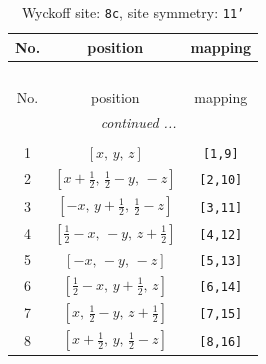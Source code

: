 \documentclass[fleqn,8pt]{jsarticle}
\begin{document}
\renewcommand{\arraystretch}{1.2}
\begin{longtable}{ccc}
\caption{Wyckoff site: {\tt 8c}, site symmetry: {\tt 11'}}
 \\
 \hline \hline
No. & position & mapping \\ \hline \endfirsthead

\multicolumn{2}{l}{\tablename\ \thetable{}} \\
 \hline \hline
No. & position & mapping \\ \hline \endhead

 \hline \hline
\multicolumn{2}{r}{\footnotesize\it continued ...} \\ \endfoot

 \hline \hline
\multicolumn{2}{r}{} \\ \endlastfoot

1 & $\left[ x,\, y,\, z \right]$ & {\tt [1,9]} \\ \hline
2 & $\left[ x + \frac{1}{2},\, \frac{1}{2} - y,\, - z \right]$ & {\tt [2,10]} \\ \hline
3 & $\left[ - x,\, y + \frac{1}{2},\, \frac{1}{2} - z \right]$ & {\tt [3,11]} \\ \hline
4 & $\left[ \frac{1}{2} - x,\, - y,\, z + \frac{1}{2} \right]$ & {\tt [4,12]} \\ \hline
5 & $\left[ - x,\, - y,\, - z \right]$ & {\tt [5,13]} \\ \hline
6 & $\left[ \frac{1}{2} - x,\, y + \frac{1}{2},\, z \right]$ & {\tt [6,14]} \\ \hline
7 & $\left[ x,\, \frac{1}{2} - y,\, z + \frac{1}{2} \right]$ & {\tt [7,15]} \\ \hline
8 & $\left[ x + \frac{1}{2},\, y,\, \frac{1}{2} - z \right]$ & {\tt [8,16]} \\
\end{longtable}
\end{document}
